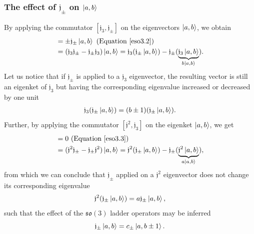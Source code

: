 \documentclass[12pt,a4paper]{report}
\theoremstyle{definition}
\theoremstyle{remark}
\theoremstyle{remark}
\begin{document}
\subsubsection{The effect of $\mathfrak{j}_\pm$ on $\ket{a,b}$}
By applying the commutator $[\mathfrak{j}_3,\mathfrak{j}_\pm]$ on the eigenvectors $\ket{a,b}$, we obtain
\begin{align*}
[\mathfrak{j}_3,\mathfrak{j}_\pm]&=\pm\mathfrak{j}_\pm\ket{a,b} \text{ (Equation~\ref{eso3.2})}\\
&=(\mathfrak{j}_3\mathfrak{j}_\pm-\mathfrak{j}_\pm\mathfrak{j}_3)\ket{a,b}= \mathfrak{j}_3(\mathfrak{j}_\pm\ket{a,b})-\mathfrak{j}_\pm(\underbrace{\mathfrak{j}_3\ket{a,b}}_{b\ket{a,b}}).
\end{align*}
Let us notice that if $\mathfrak{j}_\pm$ is applied to a $\mathfrak{j}_3$ eigenvector, the resulting vector is still an eigenket of $\mathfrak{j}_3$ but having the corresponding eigenvalue increased or decreased by one unit
\begin{align*}
\mathfrak{j}_3(\mathfrak{j}_\pm\ket{a,b})=(b\pm 1)(\mathfrak{j}_\pm\ket{a,b}).
\end{align*}
Further, by applying the commutator $[\mathfrak{j}^2,\mathfrak{j}_3]$ on the eigenket $\ket{a,b}$, we get
\begin{align*}
[\mathfrak{j}^2,\mathfrak{j}_\pm]&=0 \text{ (Equation~\ref{eso3.3})}\\
&=(\mathfrak{j}^2\mathfrak{j}_\pm-\mathfrak{j}_\pm\mathfrak{j}^2)\ket{a,b}= \mathfrak{j}^2(\mathfrak{j}_\pm\ket{a,b})-\mathfrak{j}_\pm(\underbrace{\mathfrak{j}^2\ket{a,b}}_{a\ket{a,b}}),
\end{align*}
from which we can conclude that $\mathfrak{j}_\pm$ applied on a $\mathfrak{j}^2$ eigenvector does not change its corresponding eigenvalue
\begin{align*}
\mathfrak{j}^2(\mathfrak{j}_\pm\ket{a,b})=a\mathfrak{j}_\pm\ket{a,b},
\end{align*}
such that the effect of the $\mathfrak{so}(3)$ ladder operators may be inferred
\begin{equation}\label{eso3.4}
\mathfrak{j}_\pm\ket{a,b}=c_\pm\ket{a,b\pm 1}.
\end{equation}
\end{document}
